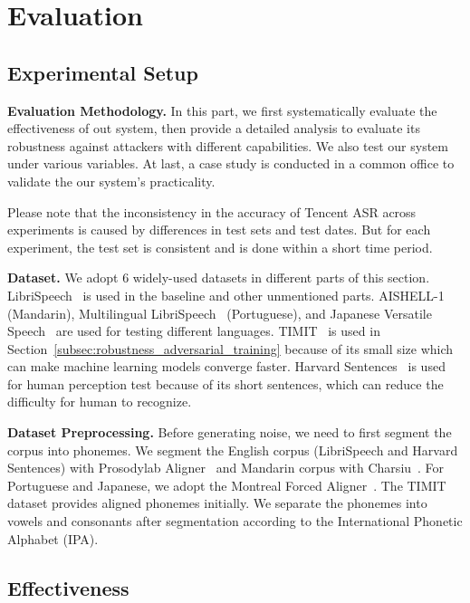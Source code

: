 \section{Evaluation}
\label{sec:eval}

\subsection{Experimental Setup}
\textbf{Evaluation Methodology.}
In this part, we first systematically evaluate the effectiveness of out system, then provide a detailed analysis to evaluate its robustness against attackers with different capabilities. We also test our system under various variables. At last, a case study is conducted in a common office to validate the our system's practicality.

Please note that the inconsistency in the accuracy of Tencent ASR across experiments is caused by differences in test sets and test dates. But for each experiment, the test set is consistent and is done within a short time period.

\textbf{Dataset.}
We adopt 6 widely-used datasets in different parts of this section. LibriSpeech~\cite{LibriSpeech} is used in the baseline and other unmentioned parts. AISHELL-1~\cite{aishell_2017} (Mandarin), Multilingual LibriSpeech~\cite{mls2020_interspeech} (Portuguese), and Japanese Versatile Speech~\cite{takamichi2019jvs} are used for testing different languages.
TIMIT~\cite{timit} is used in Section~\ref{subsec:robustness_adversarial_training} because of its small size which can make machine learning models converge faster. Harvard Sentences~\cite{harvard_sentences} is used for human perception test because of its short sentences, which can reduce the difficulty for human to recognize.

\textbf{Dataset Preprocessing.}
Before generating noise, we need to first segment the corpus into phonemes. We segment the English corpus (LibriSpeech and Harvard Sentences) with Prosodylab Aligner~\cite{prosodylab_aligner} and Mandarin corpus with Charsiu~\cite{zhu2022charsiu}. For Portuguese and Japanese, we adopt the Montreal Forced Aligner~\cite{MFA}. The TIMIT dataset provides aligned phonemes initially. We separate the phonemes into vowels and consonants after segmentation according to the International Phonetic Alphabet (IPA).

\subsection{Effectiveness}
\label{subsec:baseline}

